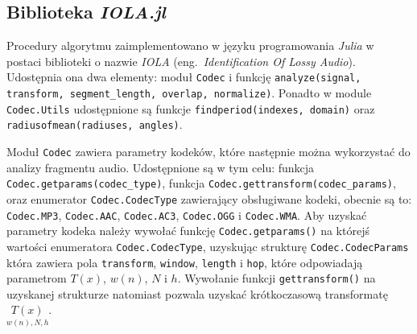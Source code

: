 \documentclass[pl,12pt]{aghdpl}
\let\Oldsubsection\subsection%
\renewcommand{\subsection}{\FloatBarrier\Oldsubsection}
\begin{document}
\subsection{Biblioteka \textit{IOLA.jl}}
Procedury algorytmu zaimplementowano w języku programowania \textit{Julia} w
postaci biblioteki o nazwie \textit{IOLA} (eng.\ \textit{Identification Of
Lossy Audio}). Udostępnia ona dwa elementy: moduł \lstinline|Codec| i funkcję
\lstinline|analyze(signal, transform, segment_length, overlap, normalize)|.
Ponadto w module \lstinline|Codec.Utils| udostępnione są funkcje
\lstinline|findperiod(indexes, domain)| oraz
\lstinline|radiusofmean(radiuses, angles)|.

Moduł \lstinline|Codec| zawiera parametry kodeków, które następnie można
wykorzystać do analizy fragmentu audio. Udostępnione są w tym celu: funkcja
\lstinline|Codec.getparams(codec_type)|, funkcja
\lstinline|Codec.gettransform(codec_params)|, oraz enumerator
\lstinline|Codec.CodecType| zawierający obsługiwane kodeki, obecnie są to:
\lstinline|Codec.MP3|, \lstinline|Codec.AAC|, \lstinline|Codec.AC3|,
\lstinline|Codec.OGG| i \lstinline|Codec.WMA|. Aby uzyskać parametry kodeka
należy wywołać funkcję \lstinline|Codec.getparams()| na którejś wartości
enumeratora \lstinline|Codec.CodecType|, uzyskując strukturę
\lstinline|Codec.CodecParams| która zawiera pola \lstinline|transform|,
\lstinline|window|, \lstinline|length| i \lstinline|hop|, które odpowiadają
parametrom $T(x)$, $w(n)$, $N$ i $h$. Wywołanie funkcji
\lstinline|gettransform()| na uzyskanej strukturze natomiast pozwala uzyskać
krótkoczasową transformatę $\underset{w(n),N,h}{T(x)}$.
\end{document}
